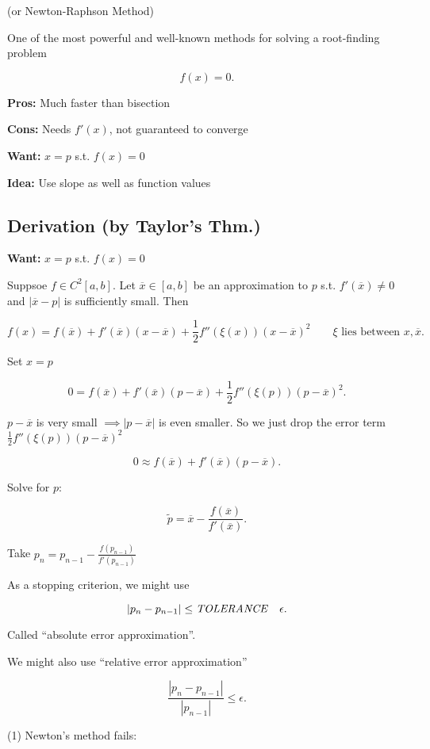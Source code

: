 (or Newton-Raphson Method)

One of the most powerful and well-known methods for solving a root-finding problem

\[
f(x) = 0
.\]

\textbf{Pros:} Much faster than bisection

\textbf{Cons:} Needs $f'(x)$, not guaranteed to converge

\textbf{Want:} $x=p$ s.t. $f(x)=0$

\textbf{Idea:} Use slope as well as function values

\subsection{Derivation (by Taylor's Thm.)}

\textbf{Want:} $x=p$ s.t. $f(x) = 0$

Suppsoe $f\in C^2[a,b]$. Let $\overline{x} \in [a,b]$ be an approximation to $p$
s.t. $f'(\overline{x})\ne 0$ and $|\overline{x}-p|$ is sufficiently small. Then

\[
  f(x) = f(\overline{x}) + f'(\overline{x})(x - \overline{x}) + \frac{1}{2}f''(\xi(x))(x-\overline{x})^2 \qquad \xi\text{ lies between } x, \overline{x}
.\]

Set $x=p$

\[
0 = f(\overline{x}) + f'(\overline{x}) (p - \overline{x}) + \frac{1}{2}f''(\xi(p))(p-\overline{x})^2
.\]

$p- \overline{x}$ is very small $\implies |p- \overline{x}|$ is even smaller.
So we just drop the error term $\frac{1}{2}f''(\xi(p))(p-\overline{x})^2$

\[
  0 \approx f(\overline{x}) + f'(\overline{x}) (p-\overline{x})
.\]

Solve for $p$:

\[
  \tilde{p} = \overline{x} - \frac{f(\overline{x})}{f'(\overline{x})}
.\]

Take $p_n = p_{n-1} - \frac{f(p_{n-1})}{f'(p_{n-1})}$ 

As a stopping criterion, we might use 

\[
  |p_n-p_{n-1}| \leq \text{\textit{TOLERANCE}} \quad \epsilon
.\]

Called \enquote{absolute error approximation}.

We might also use \enquote{relative error approximation}

\[
  \frac{|p_n - p_{n-1}|}{|p_{n-1}|} \leq \epsilon
.\]

(1) Newton's method fails:

